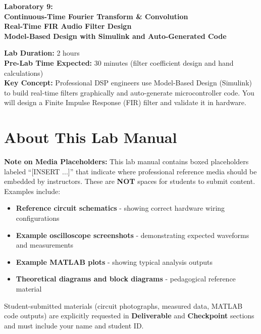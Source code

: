 \documentclass[11pt,letterpaper]{article}
\begin{document}
\begin{center}
\huge{\bf Laboratory 9:}\\
\vspace{0.2in}
\Large{\bf Continuous-Time Fourier Transform \& Convolution}\\
\Large{\bf Real-Time FIR Audio Filter Design}\\
\vspace{0.2in}
\normalsize{\bf Model-Based Design with Simulink and Auto-Generated Code}
\end{center}

\vspace{0.3in}
\noindent
\textbf{Lab Duration:} 2 hours\\
\textbf{Pre-Lab Time Expected:} 30 minutes (filter coefficient design and hand calculations)\\
\textbf{Key Concept:} Professional DSP engineers use Model-Based Design (Simulink) to build real-time filters graphically and auto-generate microcontroller code. You will design a Finite Impulse Response (FIR) filter and validate it in hardware.

\tableofcontents
\clearpage

\section*{About This Lab Manual}

\textbf{Note on Media Placeholders:} This lab manual contains boxed placeholders labeled ``[INSERT ...]'' that indicate where professional reference media should be embedded by instructors. These are \textbf{NOT} spaces for students to submit content. Examples include:

\begin{itemize}
    \item \textbf{Reference circuit schematics} - showing correct hardware wiring configurations
    \item \textbf{Example oscilloscope screenshots} - demonstrating expected waveforms and measurements
    \item \textbf{Example MATLAB plots} - showing typical analysis outputs
    \item \textbf{Theoretical diagrams and block diagrams} - pedagogical reference material
\end{itemize}

\noindent Student-submitted materials (circuit photographs, measured data, MATLAB code outputs) are explicitly requested in \textbf{Deliverable} and \textbf{Checkpoint} sections and must include your name and student ID.
\end{document}
